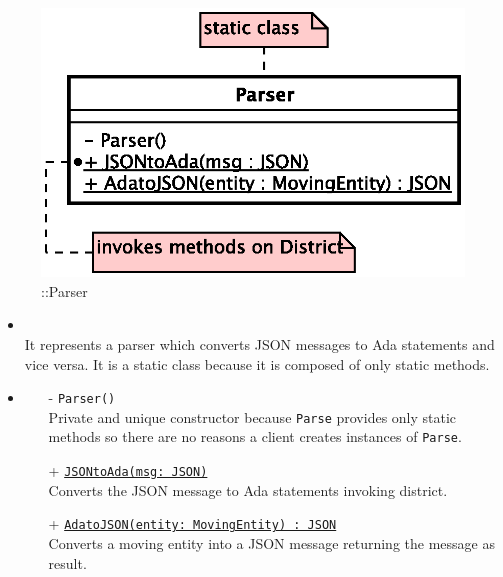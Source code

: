 \begin{figure}[h]
\centering
\includegraphics[scale=0.6,keepaspectratio]{images/solution/parser.eps}
\caption{\pInterface::Parser}
\label{fig:sd-app-parser}
\end{figure}
\FloatBarrier
\begin{itemize}
  \item \textbf{\descr} \\
    It represents a parser which converts JSON messages to Ada statements and vice versa.
    It is a static class because it is composed of only static methods.
  \item \textbf{\ops}
  \begin{itemize}
   \item[-] \texttt{Parser()} \\
   Private and unique constructor because \texttt{Parse} provides only static methods 
   so there are no reasons a client creates instances of \texttt{Parse}.
    \item[+] \texttt{\underline{JSONtoAda(msg: JSON)}} \\
    Converts the JSON message to Ada statements invoking district.
    \item[+] \texttt{\underline{AdatoJSON(entity: MovingEntity) : JSON}} \\
    Converts a moving entity into a JSON message returning the message as result.
  \end{itemize}
\end{itemize}
